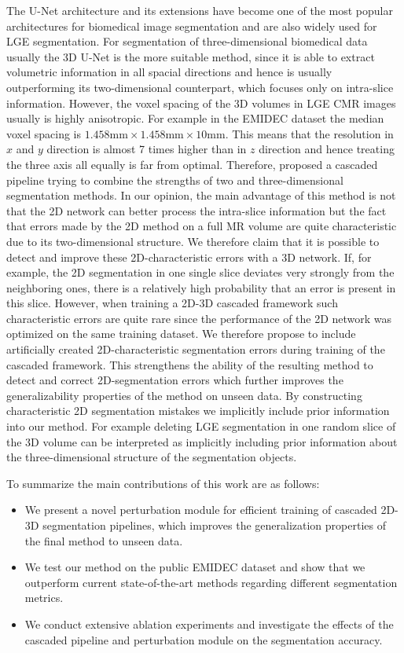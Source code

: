 \documentclass[preprint,5p,authoryear]{elsarticle}
\begin{document}
The U-Net architecture \citep{ronneberger2015u} and its extensions have become one of the most popular architectures for biomedical image segmentation and are also widely used for LGE segmentation. For segmentation of three-dimensional biomedical data usually the 3D U-Net is the more suitable method, since it is able to extract volumetric information in all spacial directions and hence is usually outperforming its two-dimensional counterpart, which focuses only on intra-slice information. However, the voxel spacing of the 3D volumes in LGE CMR images usually is highly anisotropic. For example in the EMIDEC dataset the median voxel spacing is $1.458 \mathrm{mm} \times 1.458 \mathrm{mm} \times 10 \mathrm{mm}$. This means that the resolution in $x$ and $y$ direction is almost 7 times higher than in $z$ direction and hence treating the three axis all equally is far from optimal. Therefore, \cite{zhang2021cascaded} proposed a cascaded pipeline trying to combine the strengths of two and three-dimensional segmentation methods. In our opinion, the main advantage of this method is not that the 2D network can better process the intra-slice information but the fact that errors made by the 2D method on a full MR volume are quite characteristic due to its two-dimensional structure. We therefore claim that it is possible to detect and improve these 2D-characteristic errors with a 3D network. If, for example, the 2D segmentation in one single slice deviates very strongly from the neighboring ones, there is a relatively high probability that an error is present in this slice. However, when training a 2D-3D cascaded framework such characteristic errors are quite rare since the performance of the 2D network was optimized on the same training dataset. We therefore propose to include artificially created 2D-characteristic segmentation errors during training of the cascaded framework. This strengthens the ability of the resulting method to detect and correct 2D-segmentation errors which further improves the generalizability properties of the method on unseen data. By constructing characteristic 2D segmentation mistakes we implicitly include prior information into our method. For example deleting LGE segmentation in one random slice of the 3D volume can be interpreted as implicitly including prior information about the three-dimensional structure of the segmentation objects. 

To summarize the main contributions of this work are as follows:
\begin{itemize}
    \item We present a novel perturbation module for efficient training of cascaded 2D-3D segmentation pipelines, which improves the generalization properties of the final method to unseen data.
    \item We test our method on the public EMIDEC dataset and show that we outperform current state-of-the-art methods regarding different segmentation metrics. 
    \item We conduct extensive ablation experiments and investigate the effects of the cascaded pipeline and perturbation module on the segmentation accuracy. 
\end{itemize}
\end{document}
